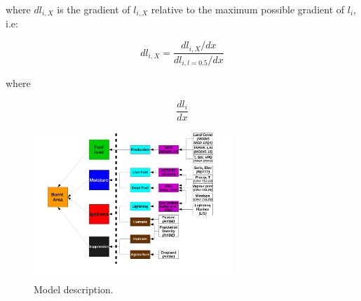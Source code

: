 where $dl_{i, X}$ is the gradient of $l_{i, X}$ relative to the maximum possible gradient of $l_{i}$, i.e:

\begin{equation}
    dl_{i, X} = \frac{dl_{i, X} / dx}{dl_{i, l = 0.5} / dx}
\end{equation}

where

\begin{equation}
    \frac{dl_{i}}{dx}
\end{equation}

\begin{figure}[!ht]
  \centering
    \includegraphics[width=0.67\textwidth]{Model_schematic.pdf}
  \caption{Model description.}
\end{figure}
